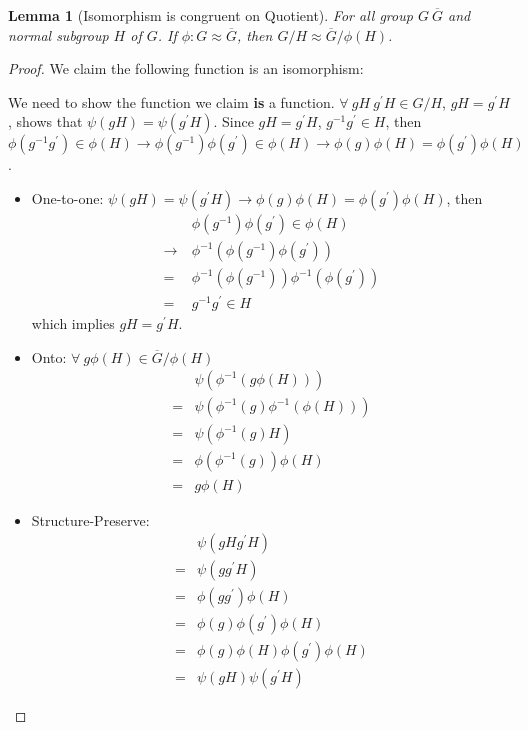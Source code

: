 \documentclass[14pt]{extarticle}
\newtheorem{lemma}{Lemma}[section]
\newcommand{\inv}[1]{#1^{-1}}
\begin{document}
\begin{lemma}[Isomorphism is congruent on Quotient]
  For all group $G \ \overline{G}$ and normal subgroup $H$ of $G$. If $\phi : G \approx \overline{G}$,
  then $G/H \approx \overline{G}/\phi(H)$.
\end{lemma}
\begin{proof}
  We claim the following function is an isomorphism:

  \begin{center}
  \end{center}

  We need to show the function we claim \textbf{is} a function.
  $\forall \ gH \ g^\prime H \in G/H$, $gH = g^\prime H$, shows that $\psi(gH) = \psi(g^\prime H)$.
  Since $gH = g^\prime H$, $\inv{g}g^\prime \in H$, 
  then $\phi(\inv{g}g^\prime) \in \phi(H) \rightarrow \phi(\inv{g})\phi(g^\prime) \in \phi(H) \rightarrow \phi(g)\phi(H) = \phi(g^\prime)\phi(H)$.

  \begin{itemize}
    \item One-to-one: $\psi(gH) = \psi(g^\prime H) \rightarrow \phi(g)\phi(H) = \phi(g^\prime)\phi(H)$, then
      \begin{align*}
         & \ \phi(\inv{g})\phi(g^\prime) \in \phi(H) \\
        \rightarrow& \ \inv{\phi}(\phi(\inv{g})\phi(g^\prime)) \\
        =& \ \inv{\phi}(\phi(\inv{g}))\inv{\phi}(\phi(g^\prime)) \\ 
        =& \ \inv{g}g^\prime \in H
      \end{align*}
      which implies $gH = g^\prime H$.
    \item Onto: $\forall \ g\phi(H) \in \overline{G}/\phi(H)$
      \begin{align*}
         & \psi(\inv{\phi}(g\phi(H))) \\
        =& \psi(\inv{\phi}(g)\inv{\phi}(\phi(H))) \\
        =& \psi(\inv{\phi}(g)H) \\
        =& \phi(\inv{\phi}(g))\phi(H) \\
        =& g\phi(H)
      \end{align*}
    \item Structure-Preserve:
      \begin{align*}
         & \psi(gH g^\prime H) \\
        =& \psi(gg^\prime H) \\
        =& \phi(gg^\prime) \phi(H) \\
        =& \phi(g)\phi(g^\prime) \phi(H) \\
        =& \phi(g)\phi(H) \phi(g^\prime)\phi(H) \\
        =& \psi(gH) \psi(g^\prime H)
      \end{align*}
  \end{itemize}
\end{proof}
\end{document}
